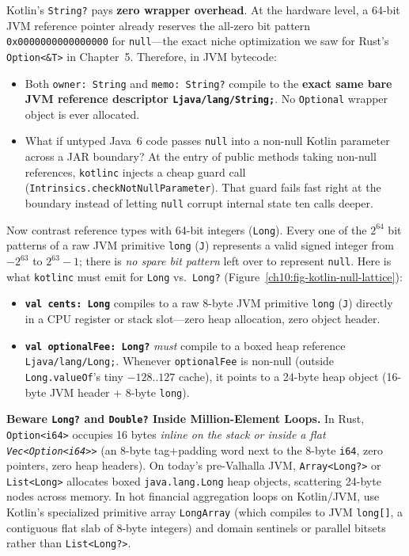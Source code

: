 Kotlin's \texttt{String?} pays \textbf{zero wrapper overhead}. At the hardware level, a 64-bit JVM reference pointer already reserves the all-zero bit pattern \texttt{0x0000000000000000} for \texttt{null}---the exact niche optimization we saw for Rust's \texttt{Option<\&T>} in Chapter~5. Therefore, in JVM bytecode:
\begin{itemize}
  \item Both \texttt{owner: String} and \texttt{memo: String?} compile to the \textbf{exact same bare JVM reference descriptor \texttt{Ljava/lang/String;}}. No \texttt{Optional} wrapper object is ever allocated.
  \item What if untyped Java~6 code passes \texttt{null} into a non-null Kotlin parameter across a JAR boundary? At the entry of public methods taking non-null references, \texttt{kotlinc} injects a cheap guard call (\texttt{Intrinsics.\allowbreak{}checkNotNullParameter}). That guard fails fast right at the boundary instead of letting \texttt{null} corrupt internal state ten calls deeper.
\end{itemize}

Now contrast reference types with 64-bit integers (\texttt{Long}). Every one of the $2^{64}$ bit patterns of a raw JVM primitive \texttt{long} (\texttt{J}) represents a valid signed integer from $-2^{63}$ to $2^{63}-1$; there is \emph{no spare bit pattern} left over to represent \texttt{null}. Here is what \texttt{kotlinc} must emit for \texttt{Long} vs.\ \texttt{Long?} (Figure~\ref{ch10:fig-kotlin-null-lattice}):
\begin{itemize}
  \item \textbf{\texttt{val cents: Long}} compiles to a raw 8-byte JVM primitive \texttt{long} (\texttt{J}) directly in a CPU register or stack slot---zero heap allocation, zero object header.
  \item \textbf{\texttt{val optionalFee: Long?}} \emph{must} compile to a boxed heap reference \texttt{Ljava/lang/Long;}. Whenever \texttt{optionalFee} is non-null (outside \texttt{Long.valueOf}'s tiny $-128..127$ cache), it points to a 24-byte heap object (16-byte JVM header + 8-byte \texttt{long}).
\end{itemize}

\begin{trapbox}
\textbf{Beware \texttt{Long?} and \texttt{Double?} Inside Million-Element Loops.} In Rust, \texttt{Option<i64>} occupies 16 bytes \emph{inline on the stack or inside a flat \texttt{Vec<Option<i64>>}} (an 8-byte tag+padding word next to the 8-byte \texttt{i64}, zero pointers, zero heap headers). On today's pre-Valhalla JVM, \texttt{Array<Long?>} or \texttt{List<Long>} allocates boxed \texttt{java.lang.Long} heap objects, scattering 24-byte nodes across memory. In hot financial aggregation loops on Kotlin/JVM, use Kotlin's specialized primitive array \texttt{LongArray} (which compiles to JVM \texttt{long[]}, a contiguous flat slab of 8-byte integers) and domain sentinels or parallel bitsets rather than \texttt{List<Long?>}.
\end{trapbox}


